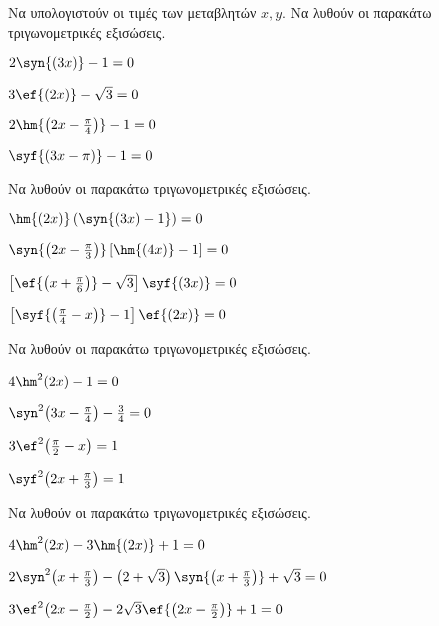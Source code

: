 \begin{multicols}{2}
\begin{center}
\end{center}
Να υπολογιστούν οι τιμές των μεταβλητών $ x,y $.
\Askhsh Να λυθούν οι παρακάτω τριγωνομετρικές εξισώσεις.
\begin{rlist}
\item $ 2\syn{(3x)}-1=0 $
\item $ 3\ef{(2x)}-\sqrt{3}=0 $
\item $ 2\hm{\left( 2x-\frac{\pi}{4}\right) }-1=0 $
\item $ \syf{(3x-\pi)}-1=0 $
\end{rlist}
\Askhsh Να λυθούν οι παρακάτω τριγωνομετρικές εξισώσεις.
\begin{rlist}
\item $ \hm{(2x)}\left(\syn{(3x)-1}\right)=0 $
\item $ \syn{\left(2x-\frac{\pi}{3}\right) } \left[ \hm{(4x)}-1\right]=0 $
\item $ \left[ \ef{\left( x+\frac{\pi}{6}\right)}-\sqrt{3}\right]\syf{(3x)}=0 $
\item $ \left[ \syf{\left( \frac{\pi}{4}-x\right)}-1\right]\ef{(2x)}=0 $
\end{rlist}
\Askhsh Να λυθούν οι παρακάτω τριγωνομετρικές εξισώσεις.
\begin{rlist}[leftmargin=4mm]
\item $ 4\hm^2{(2x)}-1=0 $
\item $ \syn^2{\left( 3x-\frac{\pi}{4}\right) }-\frac{3}{4}=0 $
\item $ 3\ef^2{\left( \frac{\pi}{2}-x\right) }=1 $
\item $ \syf^2{\left(2x+ \frac{\pi}{3}\right) }=1 $
\end{rlist}
\Askhsh Να λυθούν οι παρακάτω τριγωνομετρικές εξισώσεις.
\begin{rlist}[leftmargin=4mm]
\item $ 4\hm^2{(2x)}-3\hm{(2x)}+1=0 $
\item  $ 2\syn^2{\left( x+\frac{\pi}{3}\right)}-\left( 2+\sqrt{3}\right)\syn{\left( x+\frac{\pi}{3}\right)}+\sqrt{3}=0 $
\item $ 3\ef^2{\left(2x-\frac{\pi}{2} \right) }-2\sqrt{3}\ef{\left(2x-\frac{\pi}{2} \right) }+1=0 $
\end{rlist}
\end{multicols}
